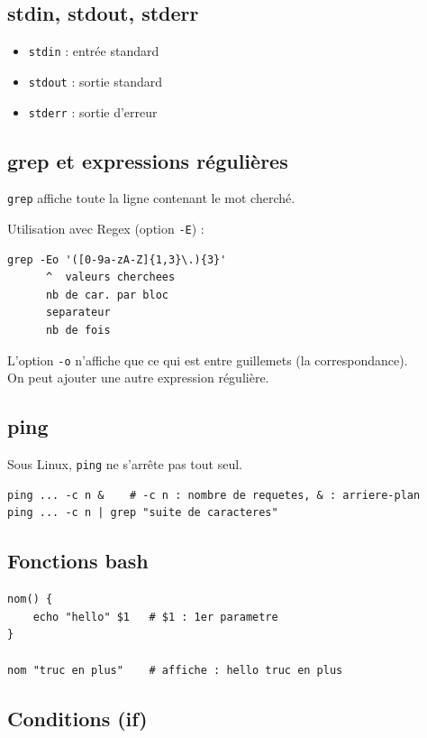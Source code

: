 \documentclass[a4paper,12pt]{article}
\begin{document}
\subsection{stdin, stdout, stderr}

\begin{itemize}
    \item \texttt{stdin}  : entrée standard
    \item \texttt{stdout} : sortie standard
    \item \texttt{stderr} : sortie d'erreur
\end{itemize}

\subsection{grep et expressions régulières}

\texttt{grep} affiche toute la ligne contenant le mot cherché.

Utilisation avec Regex (option \texttt{-E}) :
\begin{lstlisting}
grep -Eo '([0-9a-zA-Z]{1,3}\.){3}'
      ^  valeurs cherchees
      nb de car. par bloc
      separateur
      nb de fois
\end{lstlisting}
L'option \texttt{-o} n'affiche que ce qui est entre guillemets (la correspondance).\\
On peut ajouter une autre expression régulière.

\subsection{ping}

Sous Linux, \texttt{ping} ne s'arrête pas tout seul.

\begin{lstlisting}
ping ... -c n &    # -c n : nombre de requetes, & : arriere-plan
ping ... -c n | grep "suite de caracteres"
\end{lstlisting}

\subsection{Fonctions bash}

\begin{lstlisting}
nom() {
    echo "hello" $1   # $1 : 1er parametre
}

nom "truc en plus"    # affiche : hello truc en plus
\end{lstlisting}

\subsection{Conditions (if)}
\end{document}
